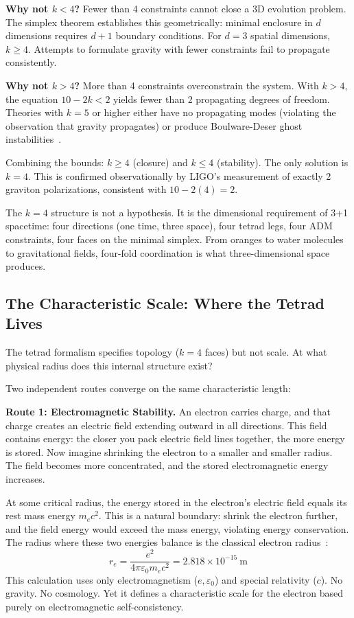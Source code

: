\documentclass[aps,prd,preprint,superscriptaddress,showpacs,preprintnumbers,amsmath,amssymb,nofootinbib]{revtex4-2}
\begin{document}
\textbf{Why not $k < 4$?} Fewer than 4 constraints cannot close a 3D evolution problem. The simplex theorem establishes this geometrically: minimal enclosure in $d$ dimensions requires $d+1$ boundary conditions. For $d = 3$ spatial dimensions, $k \geq 4$. Attempts to formulate gravity with fewer constraints fail to propagate consistently.

\textbf{Why not $k > 4$?} More than 4 constraints overconstrain the system. With $k > 4$, the equation $10 - 2k < 2$ yields fewer than 2 propagating degrees of freedom. Theories with $k = 5$ or higher either have no propagating modes (violating the observation that gravity propagates) or produce Boulware-Deser ghost instabilities~\cite{boulware1972}.

Combining the bounds: $k \geq 4$ (closure) and $k \leq 4$ (stability). The only solution is $k = 4$. This is confirmed observationally by LIGO's measurement of exactly 2 graviton polarizations, consistent with $10 - 2(4) = 2$.

The $k = 4$ structure is not a hypothesis. It is the dimensional requirement of 3+1 spacetime: four directions (one time, three space), four tetrad legs, four ADM constraints, four faces on the minimal simplex. From oranges to water molecules to gravitational fields, four-fold coordination is what three-dimensional space produces.

\subsection{The Characteristic Scale: Where the Tetrad Lives}
\label{subsec:scale}

The tetrad formalism specifies topology ($k = 4$ faces) but not scale. At what physical radius does this internal structure exist?

Two independent routes converge on the same characteristic length:

\textbf{Route 1: Electromagnetic Stability.} An electron carries charge, and that charge creates an electric field extending outward in all directions. This field contains energy: the closer you pack electric field lines together, the more energy is stored. Now imagine shrinking the electron to a smaller and smaller radius. The field becomes more concentrated, and the stored electromagnetic energy increases.

At some critical radius, the energy stored in the electron's electric field equals its rest mass energy $m_e c^2$. This is a natural boundary: shrink the electron further, and the field energy would exceed the mass energy, violating energy conservation. The radius where these two energies balance is the classical electron radius~\cite{jackson1999}:
\begin{equation}
r_e = \frac{e^2}{4\pi\varepsilon_0 m_e c^2} = 2.818 \times 10^{-15}~\text{m}
\end{equation}
This calculation uses only electromagnetism ($e, \varepsilon_0$) and special relativity ($c$). No gravity. No cosmology. Yet it defines a characteristic scale for the electron based purely on electromagnetic self-consistency.
\end{document}
